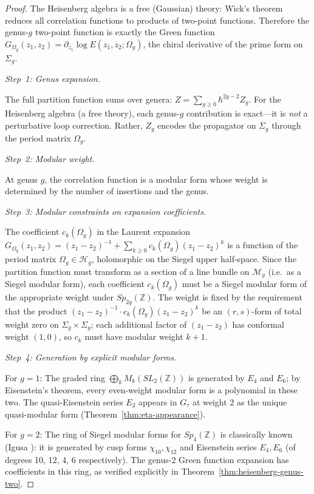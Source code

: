 \begin{proof}
The Heisenberg algebra is a free (Gaussian) theory: Wick's theorem
reduces all correlation functions to products of two-point functions.
Therefore the genus-$g$ two-point function is exactly the Green function
$G_{\Omega_g}(z_1, z_2) = \partial_{z_1}\log E(z_1, z_2; \Omega_g)$,
the chiral derivative of the prime form on $\Sigma_g$.

\emph{Step~1: Genus expansion.}

The full partition function sums over genera: $Z = \sum_{g \geq 0} \hbar^{2g-2} Z_g$.  For the Heisenberg algebra (a free theory), each genus-$g$ contribution is exact---it is \emph{not} a perturbative loop correction.  Rather, $Z_g$ encodes the propagator on $\Sigma_g$ through the period matrix $\Omega_g$.

\emph{Step~2: Modular weight.}

At genus $g$, the correlation function is a modular form whose weight is determined by the number of insertions and the genus.

\emph{Step~3: Modular constraints on expansion coefficients.}

The coefficient $c_k(\Omega_g)$ in the Laurent expansion
$G_{\Omega_g}(z_1,z_2) = (z_1-z_2)^{-1} + \sum_{k\geq 0} c_k(\Omega_g)(z_1-z_2)^k$
is a function of the period matrix $\Omega_g \in \mathcal{H}_g$, holomorphic on the Siegel upper half-space.  Since the partition function must transform as a section of a line bundle on $\mathcal{M}_g$ (i.e.\ as a Siegel modular form), each coefficient $c_k(\Omega_g)$ must be a Siegel modular form of the appropriate weight under $Sp_{2g}(\mathbb{Z})$.  The weight is fixed by the requirement that the product $(z_1-z_2)^{-1} \cdot c_k(\Omega_g)(z_1-z_2)^k$ be an $(r, s)$-form of total weight zero on $\Sigma_g \times \Sigma_g$; each additional factor of $(z_1-z_2)$ has conformal weight $(1,0)$, so $c_k$ must have modular weight $k+1$.

\emph{Step~4: Generation by explicit modular forms.}

For $g = 1$: The graded ring $\bigoplus_k M_k(SL_2(\mathbb{Z}))$ is generated by $E_4$ and $E_6$; by Eisenstein's theorem, every even-weight modular form is a polynomial in these two.  The quasi-Eisenstein series $E_2$ appears in $G_\tau$ at weight 2 as the unique quasi-modular form (Theorem~\ref{thm:eta-appearance}).

For $g = 2$: The ring of Siegel modular forms for $Sp_4(\mathbb{Z})$ is classically known (Igusa \cite{Igusa62}): it is generated by cusp forms $\chi_{10}, \chi_{12}$ and Eisenstein series $E_4, E_6$ (of degrees 10, 12, 4, 6 respectively).  The genus-2 Green function expansion has coefficients in this ring, as verified explicitly in Theorem~\ref{thm:heisenberg-genus-two}.


\end{proof}
